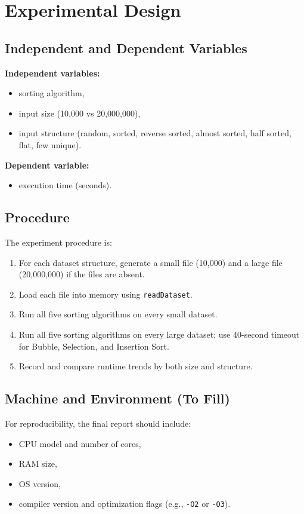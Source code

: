 \documentclass[12pt,a4paper]{article}
\begin{document}
\section{Experimental Design}
\subsection{Independent and Dependent Variables}
\textbf{Independent variables:}
\begin{itemize}
    \item sorting algorithm,
    \item input size (10,000 vs 20,000,000),
    \item input structure (random, sorted, reverse sorted, almost sorted, half sorted, flat, few unique).
\end{itemize}

\textbf{Dependent variable:}
\begin{itemize}
    \item execution time (seconds).
\end{itemize}

\subsection{Procedure}
The experiment procedure is:
\begin{enumerate}
    \item For each dataset structure, generate a small file (10,000) and a large file (20,000,000) if the files are absent.
    \item Load each file into memory using \texttt{readDataset}.
    \item Run all five sorting algorithms on every small dataset.
    \item Run all five sorting algorithms on every large dataset; use 40-second timeout for Bubble, Selection, and Insertion Sort.
    \item Record and compare runtime trends by both size and structure.
\end{enumerate}

\subsection{Machine and Environment (To Fill)}
For reproducibility, the final report should include:
\begin{itemize}
    \item CPU model and number of cores,
    \item RAM size,
    \item OS version,
    \item compiler version and optimization flags (e.g., \texttt{-O2} or \texttt{-O3}).
\end{itemize}
\end{document}
